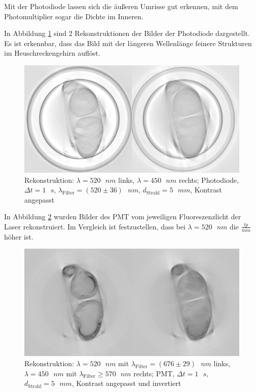 Mit der Photodiode lassen sich die äußeren Umrisse gut erkennen, mit dem Photomultiplier sogar die Dichte im Inneren.

\begin{minipage}{\linewidth}
In Abbildung \ref{fig:both-pht} sind 2 Rekonstruktionen der Bilder der Photodiode dargestellt.
Es ist erkennbar, dass das Bild mit der längeren Wellenlänge feinere Strukturen im Heuschreckengehirn auflöst.
\begin{figure}[H]
\centering
\includegraphics[width=\linewidth]{IMAGE/2-pht-c.png}
\caption{Rekonstruktion: $\lambda = 520 \text{ } \si{nm}$ links, $\lambda = 450 \text{ } \si{nm}$ rechts; Photodiode, $\Delta{t} = 1 \text{ } \si{s}$, $\lambda_\text{Filter} = (520 \pm 36) \text{ } \si{nm}$, $d_\text{Strahl} = 5 \text{ } \si{mm}$, Kontrast angepasst}
	\label{fig:both-pht}
\end{figure}
\end{minipage}

In Abbildung \ref{fig:both-pmt} wurden Bilder des PMT vom jeweiligen Fluoreszenzlicht der Laser rekonstruiert. Im Vergleich ist festzustellen, dass bei $\lambda= 520 \text{ } \si{nm}$ die $\frac{lp}{mm}$ höher ist.

\begin{figure}[H]
\centering
\includegraphics[width=\linewidth]{IMAGE/2-pmt-c.png}
\caption{Rekonstruktion: $\lambda = 520 \text{ } \si{nm}$ mit $\lambda_\text{Filter} = (676 \pm 29) \text{ } \si{nm}$ links,\\
	$\lambda = 450 \text{ } \si{nm}$ mit $\lambda_\text{Filter} \ge 570 \text{ } \si{nm}$ rechts; PMT, $\Delta{t} = 1 \text{ } \si{s}$,\\
$d_\text{Strahl} = 5 \text{ } \si{mm}$, Kontrast angepasst und invertiert}
	\label{fig:both-pmt}
\end{figure}


